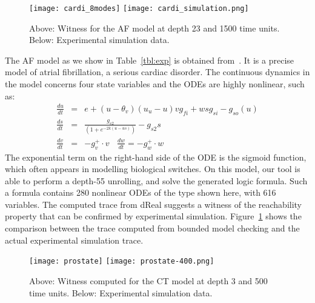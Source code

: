 \documentclass[12pt]{article}
\begin{document}
\begin{figure}[h!]
\begin{center}
\texttt{[image: cardi\_8modes]}
\texttt{[image: cardi\_simulation.png]}
\end{center}
\caption{Above: Witness for the AF model at depth 23 and 1500 time units. Below: Experimental simulation data.}\label{cardi}
\end{figure}
The AF model as we show in Table~\ref{tbl:exp} is obtained from~\cite{DBLP:conf/cav/GrosuBFGGSB11}. It is a precise model of atrial fibrillation, a serious cardiac disorder. The continuous dynamics in the model concerns four state variables and the ODEs are highly nonlinear, such as:{\small
\begin{eqnarray*}
\frac{du}{dt} &=& e + (u-\theta_v)(u_u-u ) v g_{fi} + wsg_{si}-g_{so}(u)\\
\frac{ds}{dt} &=& \displaystyle\frac{g_{s2}}{(1+e^{-2k(u-us)})} -  g_{s2}s\\
\frac{dv}{dt} &=& -g_v^+\cdot v \ \ \ \ \frac{dw}{dt} = -g_w^+\cdot w
\end{eqnarray*}
}
The exponential term on the right-hand side of the ODE is the sigmoid function, which  often appears in modelling biological switches. On this model, our tool is able to perform a depth-55 unrolling, and solve the generated logic formula. Such a formula contains 280 nonlinear ODEs of the type shown here, with 616 variables. The computed trace from {\sf dReal} suggests a witness of the reachability property that can be confirmed by experimental simulation. Figure~\ref{cardi} shows the comparison between the trace computed from bounded model checking and the actual experimental simulation trace.
\begin{figure}[h!]
\begin{center}
\texttt{[image: prostate]}
\texttt{[image: prostate-400.png]}
\end{center}
\caption{Above: Witness computed for the CT model at depth 3 and 500 time units. Below: Experimental simulation data.}\label{ct}
\end{figure}
\end{document}
